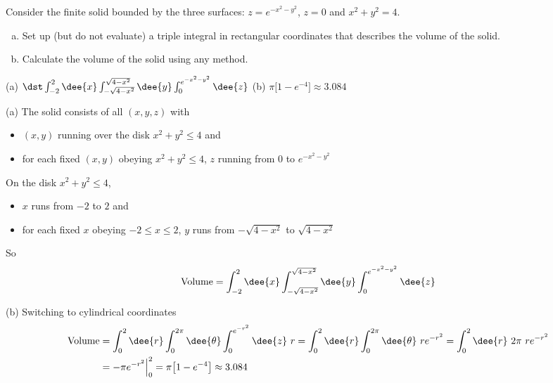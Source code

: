 \begin{question} [M200 2001A] %
Consider the finite solid bounded by the three surfaces:
$z=e^{-x^2-y^2}$, $z=0$ and $x^2+y^2=4$.
\begin{enumerate}[(a)]
\item 
Set up (but do not evaluate) a triple integral in rectangular
coordinates that describes the volume of the solid.

\item
Calculate the volume of the solid using any method.
\end{enumerate}
\end{question}

%

\begin{answer}
(a) $\dst\int_{-2}^2 \dee{x}
    \int_{-\sqrt{4-x^2}}^{\sqrt{4-x^2}}\dee{y}\int_0^{e^{-x^2-y^2}}\dee{z}$
\qquad
(b) $\pi\big[1-e^{-4}\big]\approx 3.084$
\end{answer}

\begin{solution}
(a) The solid consists of all $(x,y,z)$ with
\begin{itemize}
\item
$(x,y)$ running over the disk $x^2+y^2\le 4$ and
\item
for each fixed $(x,y)$ obeying $x^2+y^2\le 4$, $z$ running from
$0$ to $e^{-x^2-y^2}$
\end{itemize}
On the disk $x^2+y^2\le 4$,
\begin{itemize}
\item
$x$ runs from $-2$ to $2$ and
\item
for each fixed $x$ obeying $-2\le x\le 2$, $y$ runs from
$-\sqrt{4-x^2}$ to $\sqrt{4-x^2}$
\end{itemize}
So
\begin{equation*}
\text{Volume}=\int_{-2}^2 \dee{x}
    \int_{-\sqrt{4-x^2}}^{\sqrt{4-x^2}}\dee{y}\int_0^{e^{-x^2-y^2}}\dee{z}
\end{equation*}

(b) Switching to cylindrical coordinates
\begin{align*}
\text{Volume}&=\int_0^2 \dee{r}\int_0^{2\pi}\dee{\theta} \int_0^{e^{-r^2}}\dee{z}\ r
=\int_0^2 \dee{r}\int_0^{2\pi}\dee{\theta} \ r e^{-r^2}
=\int_0^2 \dee{r}\ 2\pi\ r e^{-r^2} \\
&=-\pi e^{-r^2}\Big|_0^2
=\pi\big[1-e^{-4}\big]\approx 3.084
\end{align*}
\end{solution}

